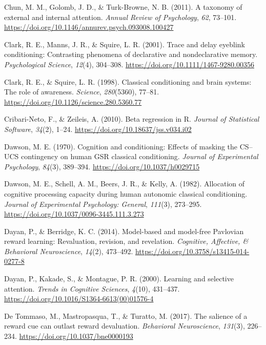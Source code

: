 \documentclass[
  man,
  floatsintext,
  longtable,
  nolmodern,
  notxfonts,
  notimes,
  mask,
  colorlinks=true,linkcolor=blue,citecolor=blue,urlcolor=blue]{apa7}
\newlength{\cslhangindent}
\newenvironment{CSLReferences}[2] %
 {\begin{list}{}{%
  \setlength{\itemindent}{0pt}
  \setlength{\leftmargin}{0pt}
  \setlength{\parsep}{0pt}
  \ifodd #1
   \setlength{\leftmargin}{\cslhangindent}
   \setlength{\itemindent}{-1\cslhangindent}
  \fi
  \setlength{\itemsep}{#2\baselineskip}}}
 {\end{list}}
\begin{document}
\begin{CSLReferences}{1}{0}
Chun, M. M., Golomb, J. D., \& Turk-Browne, N. B. (2011). A taxonomy of
external and internal attention. \emph{Annual Review of Psychology},
\emph{62}, 73--101.
\url{https://doi.org/10.1146/annurev.psych.093008.100427}

Clark, R. E., Manns, J. R., \& Squire, L. R. (2001). Trace and delay
eyeblink conditioning: Contrasting phenomena of declarative and
nondeclarative memory. \emph{Psychological Science}, \emph{12}(4),
304--308. \url{https://doi.org/10.1111/1467-9280.00356}

Clark, R. E., \& Squire, L. R. (1998). Classical conditioning and brain
systems: The role of awareness. \emph{Science}, \emph{280}(5360),
77--81. \url{https://doi.org/10.1126/science.280.5360.77}

Cribari-Neto, F., \& Zeileis, A. (2010). Beta regression in {R}.
\emph{Journal of Statistical Software}, \emph{34}(2), 1--24.
\url{https://doi.org/10.18637/jss.v034.i02}

Dawson, M. E. (1970). Cognition and conditioning: Effects of masking the
{CS}--{UCS} contingency on human {GSR} classical conditioning.
\emph{Journal of Experimental Psychology}, \emph{84}(3), 389--394.
\url{https://doi.org/10.1037/h0029715}

Dawson, M. E., Schell, A. M., Beers, J. R., \& Kelly, A. (1982).
Allocation of cognitive processing capacity during human autonomic
classical conditioning. \emph{Journal of Experimental Psychology:
General}, \emph{111}(3), 273--295.
\url{https://doi.org/10.1037/0096-3445.111.3.273}

Dayan, P., \& Berridge, K. C. (2014). Model-based and model-free
Pavlovian reward learning: Revaluation, revision, and revelation.
\emph{Cognitive, Affective, \& Behavioral Neuroscience}, \emph{14}(2),
473--492. \url{https://doi.org/10.3758/s13415-014-0277-8}

Dayan, P., Kakade, S., \& Montague, P. R. (2000). Learning and selective
attention. \emph{Trends in Cognitive Sciences}, \emph{4}(10), 431--437.
\url{https://doi.org/10.1016/S1364-6613(00)01576-4}

De Tommaso, M., Mastropasqua, T., \& Turatto, M. (2017). The salience of
a reward cue can outlast reward devaluation. \emph{Behavioral
Neuroscience}, \emph{131}(3), 226--234.
\url{https://doi.org/10.1037/bne0000193}


\end{CSLReferences}
\end{document}
